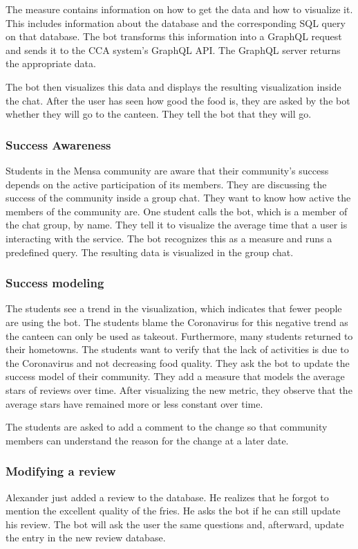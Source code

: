 The measure contains information on how to get the data and how to visualize it. This includes information about the database and the corresponding SQL query on that database. 
The bot transforms this information into a GraphQL request and sends it to the CCA system's GraphQL API. 
The GraphQL server returns the appropriate data.

The bot then visualizes this data and displays the resulting visualization inside the chat.
After the user has seen how good the food is, they are asked by the bot whether they will go to the canteen. They tell the bot that they will go.

\subsubsection{Success Awareness}
Students in the Mensa community are aware that their community's success depends on the active participation of its members. 
They are discussing the success of the community inside a group chat. They want to know how active the members of the community are. One student calls the bot, which is a member of the chat group, by name. They tell it to visualize the average time that a user is interacting with the service. The bot recognizes this as a measure and runs a predefined query. The resulting data is visualized in the group chat.

\subsubsection{Success modeling} 
The students see a trend in the visualization, which indicates that fewer people are using the bot.
The students blame the Coronavirus for this negative trend as the canteen can only be used as takeout. Furthermore, many students returned to their hometowns.
The students want to verify that the lack of activities is due to the Coronavirus and not decreasing food quality.
They ask the bot to update the success model of their community.
They add a measure that models the average stars of reviews over time.
After visualizing the new metric, they observe that the average stars have remained more or less constant over time.

The students are asked to add a comment to the change so that community members can understand the reason for the change at a later date.


\subsubsection{Modifying a review} 
Alexander just added a review to the database. He realizes that he forgot to mention the excellent quality of the fries. 
He asks the bot if he can still update his review. 
The bot will ask the user the same questions and, afterward, update the entry in the new review database.

